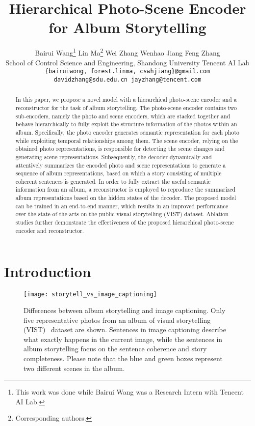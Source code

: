 \documentclass[letterpaper]{article} \usepackage{aaai19}  \usepackage{times}  \usepackage{helvet}  \usepackage{courier}  \usepackage{url}  \usepackage{graphicx}  \usepackage{color}
\begin{document}
\title{Hierarchical Photo-Scene Encoder for Album Storytelling} \author{Bairui Wang\thanks{This work was done while Bairui Wang was a Research Intern with Tencent AI Lab.} \qquad Lin Ma\thanks{Corresponding authors.} \qquad Wei Zhang \qquad Wenhao Jiang \qquad Feng Zhang  \\
School of Control Science and Engineering, Shandong University \qquad Tencent AI Lab  \\
{\tt\small\{bairuiwong, forest.linma, cswhjiang\}@gmail.com} \\
{\tt\small davidzhang@sdu.edu.cn \qquad jayzhang@tencent.com}
}
\maketitle
\begin{abstract}

In this paper, we propose a novel model with a hierarchical photo-scene encoder and a reconstructor for the task of album storytelling. The photo-scene encoder contains two sub-encoders, namely the photo and scene encoders, which are stacked together and behave hierarchically to fully exploit the structure information of the photos within an album. Specifically, the photo encoder generates semantic representation for each photo while  exploiting temporal relationships among them. The scene encoder, relying on the obtained photo representations, is responsible for detecting the scene changes and generating scene representations. Subsequently, the decoder dynamically and attentively summarizes the encoded photo and scene representations to generate a sequence of album representations, based on which a story consisting of multiple coherent sentences is generated. In order to fully extract the useful semantic information from an album, a reconstructor is employed to reproduce the summarized album representations based on the hidden states of the decoder. The proposed model can be trained in an end-to-end manner, which results in an improved performance over the state-of-the-arts on the public visual storytelling (VIST) dataset. Ablation studies further demonstrate the effectiveness of the proposed hierarchical photo-scene encoder and reconstructor.



\end{abstract}



\section{Introduction}
\begin{figure}
\centering
\texttt{[image: storytell\_vs\_image\_captioning]}
\caption{Differences between album storytelling and image captioning. Only five representative photos from an album of visual storytelling (VIST)~\cite{huang2016visual} dataset are shown. Sentences in image captioning describe what exactly happens in the current image, while the sentences in album storytelling focus on the sentence coherence and story completeness. Please note that the blue and green boxes represent two different scenes in the album.}
\label{fig:storytell_vs_image_captioning}
\end{figure}
\end{document}

